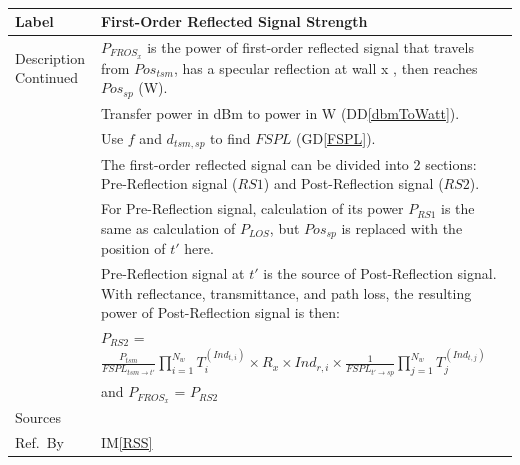 \documentclass[12pt]{article}
\newcommand{\colAwidth}{0.13\textwidth}
\newcommand{\colBwidth}{0.82\textwidth}
\newcommand{\dref}[1]{GD\ref{#1}}
\newcommand{\ddref}[1]{DD\ref{#1}}
\newcommand{\iref}[1]{IM\ref{#1}}
\begin{document}
~\newline
\noindent
\begin{minipage}{\textwidth}
\renewcommand*{\arraystretch}{1.5}
\begin{tabular}{| p{\colAwidth} | p{\colBwidth}|}
  \hline
  Label& \bf First-Order Reflected Signal Strength\\
  \hline
  Description Continued  
  &$P_{FROS_x}$ is the power of first-order reflected signal that travels from $Pos_{tsm}$,
  has a specular reflection at wall x , then reaches $Pos_{sp}$ (\si{\watt}).\\
  &Transfer power in dBm to power in \si{\watt} (\ddref{dbmToWatt}).\\
  &Use $f$ and $d_{tsm,sp}$ to find $FSPL$ (\dref{FSPL}).\\
  &The first-order reflected signal can be divided into 2 sections: Pre-Reflection signal 
  ($RS1$) and Post-Reflection signal ($RS2$).\\ 
  &For Pre-Reflection signal, calculation of its power $P_{RS1}$ is the same as 
  calculation of $P_{LOS}$, but $Pos_{sp}$ is replaced with the position of $t'$ here.\\
  &Pre-Reflection signal at $t'$ is the source of Post-Reflection signal. With 
  reflectance, transmittance, and path loss, the resulting power of Post-Reflection 
  signal is then:\\
  &$P_{RS2}$ = $\frac{P_{tsm}}{FSPL_{tsm\rightarrow t'}}\prod_{i=1}^{N_w} T_i^{(Ind_{t,i})}\times R_x \times Ind_{r,i}\times\frac{1}{FSPL_{t'\rightarrow sp}}\prod_{j=1}^{N_w} T_j^{(Ind_{t,j})}$\\
  &and $P_{FROS_x}$ = $P_{RS2}$\\
  \hline
  Sources& \cite{RfI} \\
  \hline
  Ref.\ By & \iref{RSS}\\
  \hline
\end{tabular}
\end{minipage}\\
\end{document}
